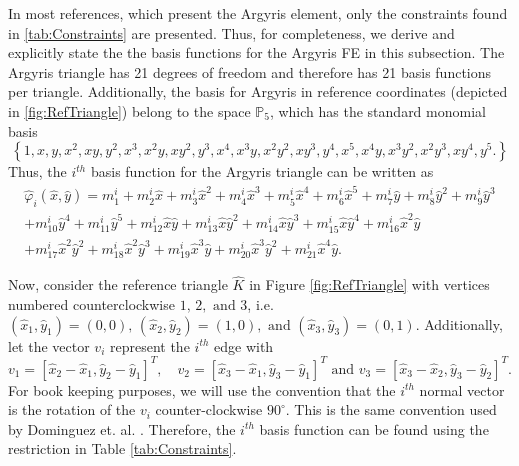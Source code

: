 

In most references, which present the Argyris element, only the constraints
found in \autoref{tab:Constraints} are presented. Thus, for completeness, we
derive and explicitly state the the basis functions for the Argyris FE in this
subsection. The Argyris triangle has 21 degrees of freedom and therefore has 21
basis functions per triangle.  Additionally, the basis for Argyris in reference
coordinates (depicted in \autoref{fig:RefTriangle}) belong to the space
$\mathbb{P}_5$, which has the standard monomial basis
\begin{equation*}
	\left\{
    1, x, y, x^2, xy, y^2, x^3, x^2y, xy^2, y^3, x^4, x^3y,
    x^2y^2, xy^3, y^4, x^5, x^4y, x^3y^2, x^2y^3, xy^4, y^5.
  \right\}
\end{equation*}
Thus, the $i^{th}$ basis function for the Argyris triangle can be written as
\begin{equation}
	\begin{split}
	\hat{\varphi}_i(\hat{x},\hat{y}) = m^i_1 + m^i_2 \hat{x} + m^i_3 \hat{x}^2 + m^i_4 \hat{x}^3 + m^i_5 \hat{x}^4 + m^i_6 \hat{x}^5 + m^i_7 \hat{y} + m^i_8
 	\hat{y}^2 + m^i_9 \hat{y}^3 \\
 + m^i_{10} \hat{y}^4 + m^i_{11} \hat{y}^5 + m^i_{12}  \hat{x} \hat{y} + m^i_{13} \hat{x} \hat{y}^2 + m^i_{14} \hat{x} \hat{y}^3 + m^i_{15}
 	\hat{x} \hat{y}^4 + m^i_{16} \hat{x}^2 \hat{y} \\
 + m^i_{17} \hat{x}^2 \hat{y}^2 + m^i_{18}\hat{x}^2 \hat{y}^3 + m^i_{19} \hat{x}^3 \hat{y} + m^i_{20}\hat{x}^3 \hat{y}^2 + m^i_{21} \hat{x}^4 \hat{y}.
 \end{split}
	\label{eqn:Basis}
\end{equation}

Now, consider the reference triangle $\hat{K}$ in Figure \ref{fig:RefTriangle} with
vertices numbered counterclockwise $1,\, 2,\text{ and } 3$, i.e.
$(\hat{x}_1,\hat{y}_1)=(0,0),\, (\hat{x}_2,\hat{y}_2)=(1,0),\text{ and } (\hat{x}_3,\hat{y}_3)=(0,1)$.
Additionally, let the vector $v_i$ represent the $i^{th}$ edge with
\begin{equation*}
  v_1 = [\hat{x}_2-\hat{x}_1,\hat{y}_2-\hat{y}_1]^T, \quad v_2=[\hat{x}_3-\hat{x}_1,\hat{y}_3-\hat{y}_1]^T \text{ and } v_3=[\hat{x}_3
  -\hat{x}_2,\hat{y}_3-\hat{y}_2]^T.
\end{equation*}
For book keeping purposes, we will use the convention that the $i^{th}$ normal
vector is the rotation of the $v_i$ counter-clockwise $90^\circ$. This is the
same convention used by Dominguez et. al. \cite{Dominguez08}. Therefore, the
$i^{th}$ basis function can be found using the restriction in Table
\ref{tab:Constraints}.


